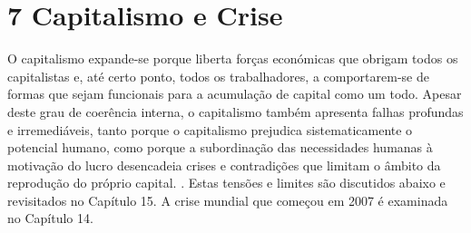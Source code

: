 \chapter{7 Capitalismo e Crise}\label{7 Capitalismo e Crise}
 \par 
O capitalismo expande-se porque liberta forças económicas que obrigam todos os capitalistas e, até certo ponto, todos os trabalhadores, a comportarem-se de formas que sejam funcionais para a acumulação de capital como um todo. Apesar deste grau de coerência interna, o capitalismo também apresenta falhas profundas e irremediáveis, tanto porque o capitalismo prejudica sistematicamente o potencial humano, como porque a subordinação das necessidades humanas à motivação do lucro desencadeia crises e contradições que limitam o âmbito da reprodução do próprio capital. . Estas tensões e limites são discutidos abaixo e revisitados no Capítulo {\color{blue}15}. A crise mundial que começou em 2007 é examinada no Capítulo {\color{blue}14}.
 \par 
